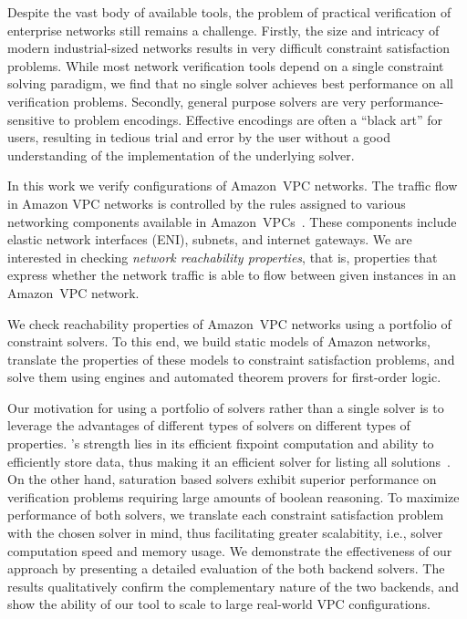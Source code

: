 %
%
Despite the vast body of available tools, the problem of practical verification of enterprise networks still remains a 
challenge. Firstly, the size and intricacy of modern industrial-sized networks results in very difficult constraint 
satisfaction problems. While most network verification 
tools depend on a single constraint solving paradigm, we find that no single solver achieves best performance on all 
verification problems. Secondly, general purpose solvers are very 
performance-sensitive to problem encodings. Effective encodings are often a ``black art'' for users, resulting in tedious trial 
and error by the user without a good understanding of the implementation of the underlying solver.

%
%
In this work we verify configurations of Amazon~VPC networks. The traffic flow in Amazon VPC networks is controlled by the rules assigned to various networking components available in Amazon~VPCs~\cite{WhatIsAmazonVPC}. These components include elastic network interfaces (ENI), subnets, and internet gateways. We are interested in checking \emph{network reachability properties}, that is, properties that express whether the network traffic is able to flow between given instances in an Amazon~VPC network.

We check reachability properties of Amazon~VPC networks using a portfolio of constraint solvers. To this end, we build static models of Amazon networks, translate the properties of these models to constraint satisfaction problems, and solve them using \Datalog engines and automated theorem provers for first-order logic.

Our motivation for using a portfolio of solvers rather than a single solver is to leverage the advantages of different types of solvers on different types of properties. \Datalog's strength lies in its efficient fixpoint computation and 
ability to efficiently store data, thus making it an efficient solver for listing all solutions~\cite{beliefs}. On the other hand, 
saturation based solvers exhibit superior performance on verification problems requiring large amounts of boolean reasoning. To 
maximize performance of both solvers, we translate each constraint satisfaction problem with the chosen solver in mind, thus 
facilitating greater scalabitity, i.e., solver computation speed and memory usage. We demonstrate the effectiveness 
of our approach by presenting a detailed evaluation of the both backend solvers. The results qualitatively confirm the complementary 
nature of the two backends, and show the ability of our tool to scale to large real-world VPC configurations.

